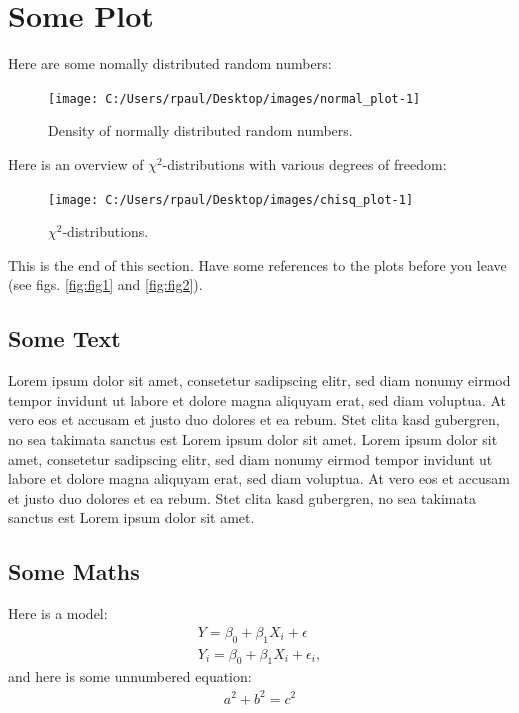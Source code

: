 \documentclass[oneside, 12pt, a4paper]{article}
\begin{document}
\section{Some Plot}

Here are some nomally distributed random numbers:

\begin{figure}[H]

{\centering \texttt{[image: C:/Users/rpaul/Desktop/images/normal\_plot-1]} 

}

\caption{\label{fig:fig1}Density of normally distributed random numbers.}\label{fig:normal_plot}
\end{figure}

Here is an overview of \(\chi^2\)-distributions with various degrees of
freedom:

\begin{figure}[H]

{\centering \texttt{[image: C:/Users/rpaul/Desktop/images/chisq\_plot-1]} 

}

\caption{\label{fig:fig2}$\chi^2$-distributions.}\label{fig:chisq_plot}
\end{figure}

This is the end of this section. Have some references to the plots
before you leave (see figs. \ref{fig:fig1} and \ref{fig:fig2}).

\subsection{Some Text}

Lorem ipsum dolor sit amet, consetetur sadipscing elitr, sed diam nonumy
eirmod tempor invidunt ut labore et dolore magna aliquyam erat, sed diam
voluptua. At vero eos et accusam et justo duo dolores et ea rebum. Stet
clita kasd gubergren, no sea takimata sanctus est Lorem ipsum dolor sit
amet. Lorem ipsum dolor sit amet, consetetur sadipscing elitr, sed diam
nonumy eirmod tempor invidunt ut labore et dolore magna aliquyam erat,
sed diam voluptua. At vero eos et accusam et justo duo dolores et ea
rebum. Stet clita kasd gubergren, no sea takimata sanctus est Lorem
ipsum dolor sit amet.

\subsection{Some Maths}

Here is a model: \begin{align}
Y = \beta_0 + \beta_1 X_i + \epsilon \\
Y_i = \beta_0 + \beta_1 X_i + \epsilon_i ,
\end{align} and here is some unnumbered equation: \begin{align*}
a^2 + b^2 = c^2
\end{align*}
\end{document}
